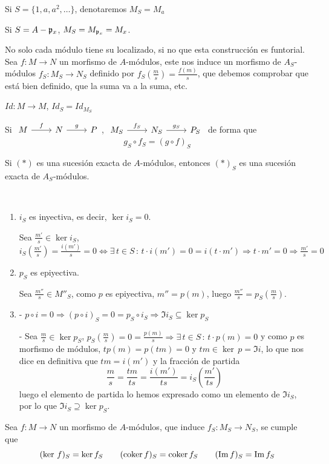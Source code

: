 Si $S=\{1,a,a^2, \ldots\}$, denotaremos $M_S = M_a$

Si $S=A-\mathfrak{p}_x$, $M_S = M_{\mathfrak{p}_x}=M_x$.

No solo cada m\'odulo tiene su localizado, si no que esta construcci\'on es funtorial. Sea $f:M\longrightarrow N$ un morfismo de $A$-m\'odulos, este nos induce un morfismo de $A_S$-m\'odulos $f_S:M_S \longrightarrow N_S$ definido por $f_S(\frac{m}{s}) = \frac{f(m)}{s}$, que debemos comprobar que est\'a bien definido, que la suma va a la suma, etc.

$Id: M \longrightarrow M$, $Id_S=Id_{M_S}$

Si $\bt M \arrow{r}{f} & N \arrow{r}{g} & P \et$, $\bt M_S \arrow{r}{f_S} & N_S \arrow{r}{g_S} & P_S \et$ de forma que $$g_S \circ f_S = (g\circ f)_S$$

\begin{prop}
     Si $(*)$ es una sucesi\'on exacta de $A$-m\'odulos, entonces $(*)_S$ es una sucesi\'on exacta de $A_S$-m\'odulos.
\end{prop}
\begin{dem} \, \vspace{-3mm}
\begin{enumerate}
    \item $i_S$ es inyectiva, es decir, $\ker i_S = 0$.

    Sea $\frac{m'}{s}\in \ker i_S$, $i_S(\frac{m'}{s}) = \frac{i(m')}{s} = 0 \iff \exists \, t\in S \, : \, t \cdot i(m')=0 = i(t\cdot m') \Rightarrow t\cdot m' = 0 \Rightarrow \frac{m'}{s}=0 $
\item $p_S$ es epiyectiva. 

Sea $\frac{m''}{s} \in M''_S$, como $p$ es epiyectiva, $m''=p(m)$, luego $\frac{m''}{s}=p_S(\frac{m}{s})$. 
\item - $p\circ i =0 \Rightarrow (p\circ i)_S = 0 = p_S \circ i_S \Rightarrow \Im i_S \subseteq \ker  p_S$

- Sea $\frac{m}{s} \in \ker  p_S$, $p_S (\frac{m}{s}) = 0 = \frac{p(m)}{s} \Rightarrow \exists \, t \in S \, : \, t \cdot p(m) = 0$ y como $p$ es morfismo de m\'odulos, $tp(m)=p(tm)=0$ y $tm \in \ker\, p = \Im i$, lo que nos dice en definitiva que $tm=i(m')$ y la fracci\'on de partida
$$\frac{m}{s} = \frac{tm}{ts} = \frac{i(m')}{ts} = i_S\left(\frac{m'}{ts}\right)$$
luego el elemento de partida lo hemos expresado como un elemento de $\Im i_S$, por lo que $\Im i_S \supseteq \ker  p_S$.
\end{enumerate}
\end{dem}
\begin{cor}
    Sea $f:M \longrightarrow N$ un morfismo de $A$-m\'odulos, que induce $f_S: M_S \longrightarrow N_S$, se cumple que 
    $$(\ker\, f)_S = \ker f_S \qquad (\operatorname{coker} f)_S=\operatorname{coker} f_S\qquad (\Im f)_S = \Im f_S$$
\end{cor}
